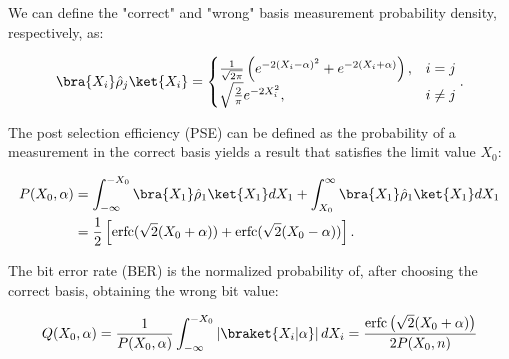 We can define the "correct" and "wrong" basis measurement probability density, respectively, as:

\begin{equation}\label{eq:probdensity}
\bra{X_i}\hat{\rho}_j\ket{X_i}=
\begin{cases}
\frac{1}{\sqrt{2\pi}}\left(e^{-2(X_i-\alpha)^2}+e^{-2(X_i+\alpha)}\right), & i=j\\
\sqrt{\frac{2}{\pi}}e^{-2X_i^2}, &i\neq j
\end{cases}.
\end{equation}

The post selection efficiency (PSE) can be defined as the probability of a measurement in the correct basis yields a result that satisfies the limit value $X_0$:

\begin{equation}\label{eq:postselecteff}
\begin{aligned}
P(X_0,\alpha)&=\int^{-X_0}_{-\infty}\bra{X_1}\hat{\rho}_1\ket{X_1}dX_1+\int^{\infty}_{X_0}\bra{X_1}\hat{\rho}_1\ket{X_1}dX_1\\
&=\frac{1}{2}\left[\text{erfc}(\sqrt{2}(X_0+\alpha))+\text{erfc}(\sqrt{2}(X_0-\alpha))\right].
\end{aligned}
\end{equation}

The bit error rate (BER) is the normalized probability of, after choosing the correct basis, obtaining the wrong bit value:

\begin{equation}\label{eq:biterrorratio}
Q(X_0,\alpha)=\frac{1}{P(X_0,\alpha)}\int_{-\infty}^{-X_0}\left|\braket{X_i|\alpha}\right|dX_i=\frac{\text{erfc}\left(\sqrt{2}(X_0+\alpha)\right)}{2P(X_0,n)}
\end{equation}

